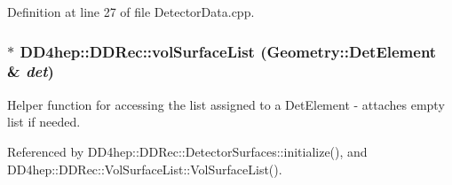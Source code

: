 Definition at line 27 of file DetectorData.cpp.\hypertarget{namespace_d_d4hep_1_1_d_d_rec_a59c95bbf8cdb6547cfa3f9fa969d4031}{
\subsubsection[{volSurfaceList}]{ $\ast$ DD4hep::DDRec::volSurfaceList (Geometry::DetElement \& {\em det})}}
\label{namespace_d_d4hep_1_1_d_d_rec_a59c95bbf8cdb6547cfa3f9fa969d4031}
Helper function for accessing the list assigned to a DetElement -\/ attaches empty list if needed. 

Referenced by DD4hep::DDRec::DetectorSurfaces::initialize(), and DD4hep::DDRec::VolSurfaceList::VolSurfaceList().